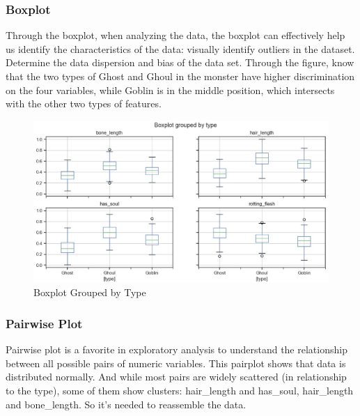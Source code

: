 \subsubsection{Boxplot}
Through the boxplot, when analyzing the data, the boxplot can effectively help us identify the characteristics of the data: visually identify outliers in the dataset. Determine the data dispersion and bias of the data set. Through the figure, know that the two types of Ghost and Ghoul in the monster have higher discrimination on the four variables, while Goblin is in the middle position, which intersects with the other two types of features.


\begin{figure}[h]\centering
	\includegraphics[scale=0.3]{figures/boxplot.eps}
	\caption{Boxplot Grouped by Type}
\end{figure}


\subsubsection{Pairwise Plot} 
Pairwise plot is a favorite in exploratory analysis to understand the relationship between all possible pairs of numeric variables. This pairplot shows that data is distributed normally. And while most pairs are widely scattered (in relationship to the type), some of them show clusters: hair_length and has_soul, hair_length and bone_length. So it's needed to reassemble the data.%


